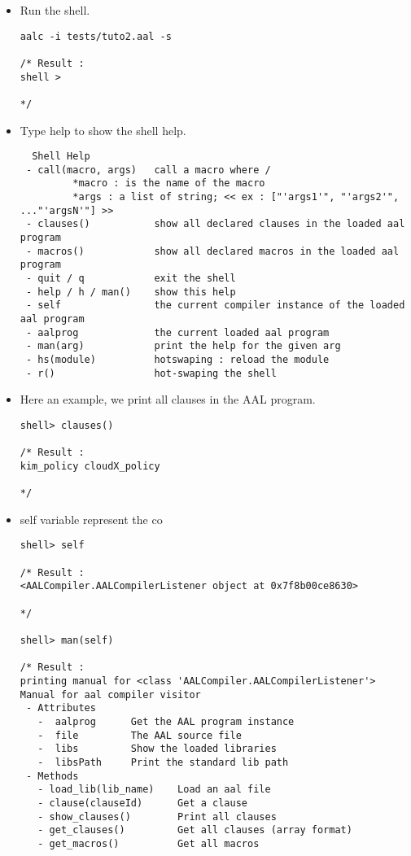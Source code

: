 {
\lstset{style=shell}

\begin{itemize}
	\item Run the shell.
\begin{lstlisting}
aalc -i tests/tuto2.aal -s

/* Result : 
shell >

*/
\end{lstlisting}

  \item Type help to show the shell help.
\begin{lstlisting}
  Shell Help
 - call(macro, args)   call a macro where /
         *macro : is the name of the macro
         *args : a list of string; << ex : ["'args1'", "'args2'", ..."'argsN'"] >>
 - clauses()           show all declared clauses in the loaded aal program
 - macros()            show all declared macros in the loaded aal program
 - quit / q            exit the shell
 - help / h / man()    show this help
 - self                the current compiler instance of the loaded aal program
 - aalprog             the current loaded aal program 
 - man(arg)            print the help for the given arg
 - hs(module)          hotswaping : reload the module
 - r()                 hot-swaping the shell
\end{lstlisting}

  \item Here an example, we print all clauses in the AAL program.
\begin{lstlisting}
shell> clauses()

/* Result :
kim_policy cloudX_policy 

*/
\end{lstlisting}

  \item self variable represent the co
\begin{lstlisting}
shell> self

/* Result :
<AALCompiler.AALCompilerListener object at 0x7f8b00ce8630>

*/

shell> man(self)

/* Result :
printing manual for <class 'AALCompiler.AALCompilerListener'>
Manual for aal compiler visitor
 - Attributes
   -  aalprog      Get the AAL program instance
   -  file         The AAL source file
   -  libs         Show the loaded libraries
   -  libsPath     Print the standard lib path
 - Methods
   - load_lib(lib_name)    Load an aal file
   - clause(clauseId)      Get a clause
   - show_clauses()        Print all clauses
   - get_clauses()         Get all clauses (array format)
   - get_macros()          Get all macros


\end{lstlisting}
\end{itemize}}
